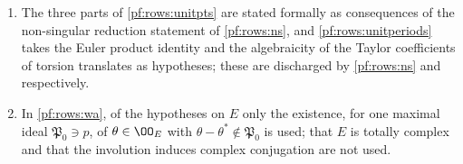 \begin{remark}
\begin{enumerate}[label=(\arabic*)]
\item The three parts of \cref{pf:rows:unitpts} are stated formally as consequences of the non-singular reduction statement
of \cref{pf:rows:ns}, and \cref{pf:rows:unitperiods} takes the Euler product identity and the algebraicity of the Taylor
coefficients of torsion translates as hypotheses; these are discharged by \cref{pf:rows:ns} and
 respectively.
\item In \cref{pf:rows:wa}, of the hypotheses on $E$ only the existence, for one maximal ideal $\mathfrak P_0\ni p$, of
$\theta\in\OO_E$ with $\theta-\theta^*\notin\mathfrak P_0$ is used; that $E$ is totally complex and that the involution induces
complex conjugation are not used.
\end{enumerate}
\end{remark}
